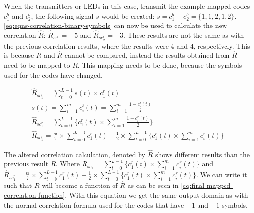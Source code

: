 When the transmitters or LEDs in this case, transmit the example mapped codes $c^b_1$ and $c^b_2$, the following signal $s$ would be created: $s = c^b_1 + c^b_2= \{ 1, 1, 2, 1, 2 \}$.
\autoref{eq:eqns-correlation-binary-symbols} can now be used to calculate the new correlation $\hat{R}$: $\hat{R}_{sc^r_{1}} = -5$ and $\hat{R}_{sc^r_{2}} = -3$.
These results are not the same as with the previous correlation results, where the results were 4 and 4, respectively.
This is because $R$ and $\hat{R}$ cannot be compared, instead the results obtained from $\hat{R}$ need to be mapped to $R$.
This mapping needs to be done, because the symbols used for the codes have changed.





\begin{equation}
	\begin{array}{l}
		\hat{R}_{sc^r_{1}} = \displaystyle\sum_{t = 0} ^ {L - 1} s(t) \times c^r_1(t)	 \\
		s(t) = \displaystyle\sum_{i = 1} ^ {m} c^b_i(t) = \displaystyle\sum_{i = 1} ^ {m} \frac{1 - c^r_i(t)}{2} \\
		\hat{R}_{sc^r_{1}} = \displaystyle\sum_{t = 0} ^ {L - 1} \Bigg\{  c^r_1(t)	\times \displaystyle\sum_{i = 1} ^ {m} \frac{1 - c^r_i(t)}{2}  	\Bigg\} \\
		\hat{R}_{sc^r_{1}} = \frac{m}{2} \times \displaystyle\sum_{t = 0} ^ {L - 1} c^r_1(t) - \frac{1}{2} \times \displaystyle\sum_{t = 0} ^ {L - 1}  \Bigg\{ c^r_1(t) \times \displaystyle\sum_{i = 1} ^ {m} c^r_i(t) \Bigg\}
	\end{array} 
	\label{eq:eqns-correlation-binary-symbols}
\end{equation}





The altered correlation calculation, denoted by $\hat{R}$ shows different results than the previous result $R$.
Where $R_{sc_{1}} = \displaystyle\sum_{t = 0} ^ {L - 1} \Bigg\{ c^r_1(t) \times  \displaystyle\sum_{i = 1} ^ {m} c^r_i(t) \Bigg\} $ and $\hat{R}_{sc^r_{1}} = \frac{m}{2} \times \displaystyle\sum_{t = 0} ^ {L - 1} c^r_1(t) - \frac{1}{2} \times \displaystyle\sum_{t = 0} ^ {L - 1}  \Bigg\{ c^r_1(t) \times \displaystyle\sum_{i = 1} ^ {m} c^r_i(t) \Bigg\}$.
We can write it such that $R$ will become a function of $\hat{R}$ as can be seen in \autoref{eq:final-mapped-correlation-function}.
With this equation we get the same output domain as with the normal correlation formula used for the codes that have $+1$ and $-1$ symbols.



